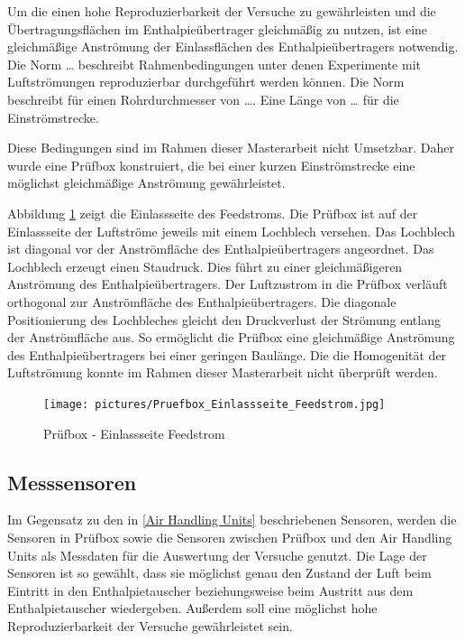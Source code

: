 Um die einen hohe Reproduzierbarkeit der Versuche zu gewährleisten und die Übertragungsflächen im Enthalpieübertrager gleichmäßig zu nutzen, ist eine gleichmäßige Anströmung der Einlassflächen des Enthalpieübertragers notwendig. Die Norm … beschreibt Rahmenbedingungen unter denen Experimente mit Luftströmungen reproduzierbar durchgeführt werden können. Die Norm beschreibt für einen Rohrdurchmesser von  …. Eine Länge von … für die Einströmstrecke. 

Diese Bedingungen sind im Rahmen dieser Masterarbeit nicht Umsetzbar. Daher wurde eine Prüfbox konstruiert, die bei einer kurzen Einströmstrecke eine möglichst gleichmäßige Anströmung gewährleistet.

Abbildung \ref{fig:Prüfbox - Einlassseite Feedstrom} zeigt die Einlassseite des Feedstroms. Die Prüfbox ist auf der Einlassseite der Luftströme jeweils mit einem Lochblech versehen. Das Lochblech ist diagonal vor der Anströmfläche des Enthalpieübertragers angeordnet. Das Lochblech erzeugt einen Staudruck. Dies führt zu einer gleichmäßigeren Anströmung des Enthalpieübertragers. Der Luftzustrom in die Prüfbox verläuft orthogonal zur Anströmfläche des Enthalpieübertragers. Die diagonale Positionierung des Lochbleches gleicht den Druckverlust der Strömung entlang der Anströmfläche aus. So ermöglicht die Prüfbox eine gleichmäßige Anströmung des Enthalpieübertragers bei einer geringen Baulänge. Die die Homogenität der Luftströmung konnte im Rahmen dieser Masterarbeit nicht überprüft werden.

\begin{figure} [h]
	\centering
	\texttt{[image: pictures/Pruefbox\_Einlassseite\_Feedstrom.jpg]}
	\caption{Prüfbox - Einlassseite Feedstrom}
	\label{fig:Prüfbox - Einlassseite Feedstrom}
\end{figure}


\subsection{Messsensoren}
\label{Messsensoren}

Im Gegensatz zu den in \ref{Air Handling Units} beschriebenen Sensoren, werden die Sensoren in Prüfbox sowie die Sensoren zwischen Prüfbox und den Air Handling Units als Messdaten für die Auswertung der Versuche genutzt. Die Lage der Sensoren ist so gewählt, dass sie möglichst genau den Zustand der Luft beim Eintritt in den Enthalpietauscher beziehungsweise beim Austritt aus dem Enthalpietauscher wiedergeben. Außerdem soll eine möglichst hohe Reproduzierbarkeit der Versuche gewährleistet sein.

